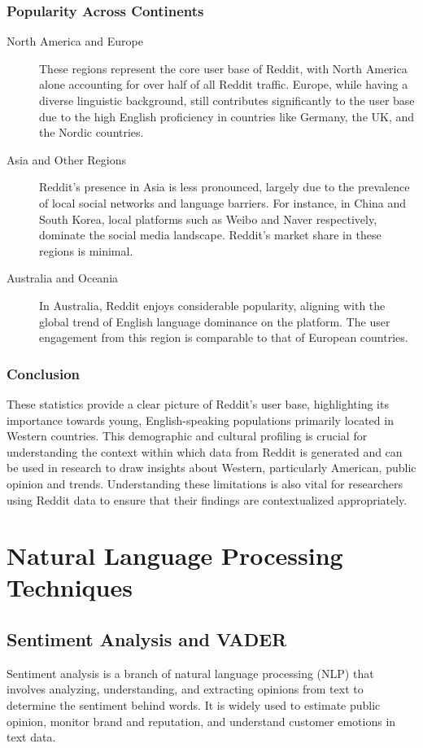 \subsubsection{Popularity Across Continents}
\begin{description}
    \item[North America and Europe] These regions represent the core user base of Reddit, with North America alone accounting for over half of all Reddit traffic. Europe, while having a diverse linguistic background, still contributes significantly to the user base due to the high English proficiency in countries like Germany, the UK, and the Nordic countries.
    \item[Asia and Other Regions] Reddit's presence in Asia is less pronounced, largely due to the prevalence of local social networks and language barriers. For instance, in China and South Korea, local platforms such as Weibo and Naver respectively, dominate the social media landscape. Reddit's market share in these regions is minimal.
    \item[Australia and Oceania] In Australia, Reddit enjoys considerable popularity, aligning with the global trend of English language dominance on the platform. The user engagement from this region is comparable to that of European countries.
\end{description}

\subsubsection{Conclusion}
These statistics provide a clear picture of Reddit's user base, highlighting its importance towards young, English-speaking populations primarily located in Western countries. This demographic and cultural profiling is crucial for understanding the context within which data from Reddit is generated and can be used in research to draw insights about Western, particularly American, public opinion and trends. Understanding these limitations is also vital for researchers using Reddit data to ensure that their findings are contextualized appropriately.

\section{Natural Language Processing Techniques}

\subsection{Sentiment Analysis and VADER}
\label{subsec:sentiment}
Sentiment analysis is a branch of natural language processing (NLP) that involves analyzing, understanding, and extracting opinions from text to determine the sentiment behind words. It is widely used to estimate public opinion, monitor brand and reputation, and understand customer emotions in text data.
